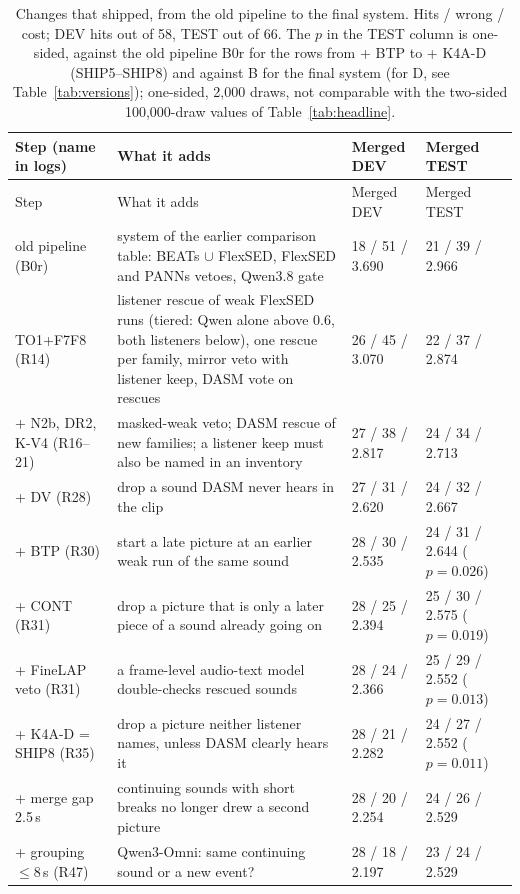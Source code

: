{\small
\begin{longtable}{L{2.6cm}L{6.1cm}L{2.5cm}L{3.0cm}}
\caption{Changes that shipped, from the old pipeline to the final system. Hits / wrong / cost; DEV hits out of 58, TEST out of 66.
The $p$ in the TEST column is one-sided, against the old pipeline B0r for the rows from + BTP to + K4A-D (SHIP5--SHIP8) and against B for the final system (for D, see Table~\ref{tab:versions}); one-sided, 2{,}000 draws, not comparable with the two-sided 100{,}000-draw values of Table~\ref{tab:headline}.}\label{tab:shipchain}\\
\toprule
Step (name in logs) & What it adds & Merged DEV & Merged TEST \\
\midrule\endfirsthead
\toprule Step & What it adds & Merged DEV & Merged TEST \\ \midrule\endhead
\bottomrule\endfoot
old pipeline (B0r) & system of the earlier comparison table: BEATs $\cup$ FlexSED, FlexSED and PANNs vetoes, Qwen3.8 gate & 18 / 51 / 3.690 & 21 / 39 / 2.966 \\
TO1+F7F8 (R14) & listener rescue of weak FlexSED runs (tiered: Qwen alone above 0.6, both listeners below), one rescue per family, mirror veto with listener keep, DASM vote on rescues & 26 / 45 / 3.070 & 22 / 37 / 2.874 \\
+ N2b, DR2, K-V4 (R16--21) & masked-weak veto; DASM rescue of new families; a listener keep must also be named in an inventory & 27 / 38 / 2.817 & 24 / 34 / 2.713 \\
+ DV (R28) & drop a sound DASM never hears in the clip & 27 / 31 / 2.620 & 24 / 32 / 2.667 \\
+ BTP (R30) & start a late picture at an earlier weak run of the same sound & 28 / 30 / 2.535 & 24 / 31 / 2.644 ($p = 0.026$) \\
+ CONT (R31) & drop a picture that is only a later piece of a sound already going on & 28 / 25 / 2.394 & 25 / 30 / 2.575 ($p = 0.019$) \\
+ FineLAP veto (R31) & a frame-level audio-text model double-checks rescued sounds & 28 / 24 / 2.366 & 25 / 29 / 2.552 ($p = 0.013$) \\
+ K4A-D = SHIP8 (R35) & drop a picture neither listener names, unless DASM clearly hears it & 28 / 21 / 2.282 & 24 / 27 / 2.552 ($p = 0.011$) \\
+ merge gap 2.5\,s & continuing sounds with short breaks no longer drew a second picture & 28 / 20 / 2.254 & 24 / 26 / 2.529 \\
+ grouping $\leq$8\,s (R47) & Qwen3-Omni: same continuing sound or a new event? & 28 / 18 / 2.197 & 23 / 24 / 2.529 \\

\end{longtable}}

